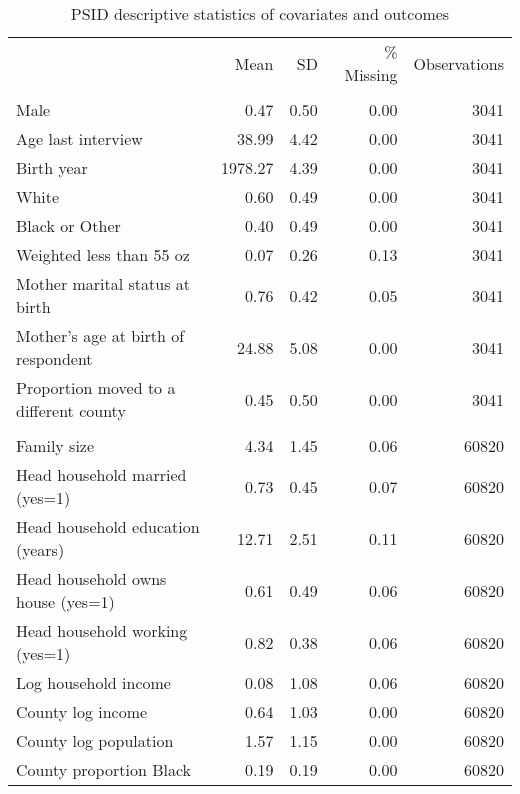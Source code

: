 \begin{table}[htp]
\scriptsize
\setlength{\tabcolsep}{10pt}
\renewcommand{\arraystretch}{0.8}
\begin{threeparttable}
\centering
\caption{PSID descriptive statistics of covariates and outcomes} 
\label{tab:psid_descriptives}
\begin{tabular}{lrrrr}
  \hline
\addlinespace
& Mean & SD & \% Missing & Observations \\
\addlinespace
 \hline
  \addlinespace
\multicolumn{7}{l}{\textit{Time-invariant covariates}} \\
\addlinespace
\quad Male & 0.47 & 0.50 & 0.00 & 3041 \\ 
  \quad Age last interview & 38.99 & 4.42 & 0.00 & 3041 \\ 
  \quad Birth year & 1978.27 & 4.39 & 0.00 & 3041 \\ 
  \quad White & 0.60 & 0.49 & 0.00 & 3041 \\ 
  \quad Black or Other & 0.40 & 0.49 & 0.00 & 3041 \\ 
  \quad Weighted less than 55 oz & 0.07 & 0.26 & 0.13 & 3041 \\ 
  \quad Mother marital status at birth & 0.76 & 0.42 & 0.05 & 3041 \\ 
  \quad Mother's age at birth of respondent & 24.88 & 5.08 & 0.00 & 3041 \\ 
  \quad Proportion moved to a different county & 0.45 & 0.50 & 0.00 & 3041 \\ 
   \addlinespace
\multicolumn{7}{l}{\textit{Time-variant covariates}} \\
\addlinespace
\quad Family size & 4.34 & 1.45 & 0.06 & 60820 \\ 
  \quad Head household married (yes=1) & 0.73 & 0.45 & 0.07 & 60820 \\ 
  \quad Head household education (years) & 12.71 & 2.51 & 0.11 & 60820 \\ 
  \quad Head household owns house (yes=1) & 0.61 & 0.49 & 0.06 & 60820 \\ 
  \quad Head household working (yes=1) & 0.82 & 0.38 & 0.06 & 60820 \\ 
  \quad Log household income & 0.08 & 1.08 & 0.06 & 60820 \\ 
  \quad County log income & 0.64 & 1.03 & 0.00 & 60820 \\ 
  \quad County log population & 1.57 & 1.15 & 0.00 & 60820 \\ 
  \quad County proportion Black & 0.19 & 0.19 & 0.00 & 60820 \\ 

\end{tabular}
\end{threeparttable}
\end{table}
